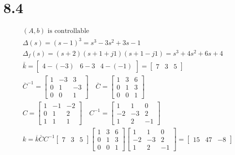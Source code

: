 \documentclass{article}
\begin{document}
\section*{8.4}
$$
\begin{aligned}
&(A, b) \text { is controllable }\\
&\Delta(s)=(s-1)^{3}=s^{3}-3 s^{2}+3 s-1\\
&\Delta_{f}(s)=(s+2)(s+1+j 1)(s+1-j 1)=s^{3}+4 s^{2}+6 s+4\\
&\bar{k}=\left[\begin{array}{lll}
4-(-3) & 6-3 & 4-(-1)
\end{array}\right]=\left[\begin{array}{lll}
7 & 3 & 5
\end{array}\right]\\
&\bar{C}^{-1}=\left[\begin{array}{ccc}
1 & -3 & 3 \\
0 & 1 & -3 \\
0 & 0 & 1
\end{array}\right] \quad \bar{C}=\left[\begin{array}{ccc}
1 & 3 & 6 \\
0 & 1 & 3 \\
0 & 0 & 1
\end{array}\right]\\
&C=\left[\begin{array}{ccc}
1 & -1 & -2 \\
0 & 1 & 2 \\
1 & 1 & 1
\end{array}\right] \quad C^{-1}=\left[\begin{array}{ccc}
1 & 1 & 0 \\
-2 & -3 & 2 \\
1 & 2 & -1
\end{array}\right]\\
&k=\overline{k} \bar{C} C^{-1}\left[\begin{array}{lll}
7 & 3 & 5
\end{array}\right]\left[\begin{array}{ccc}
1 & 3 & 6 \\
0 & 1 & 3 \\
0 & 0 & 1
\end{array}\right]\left[\begin{array}{ccc}
1 & 1 & 0 \\
-2 & -3 & 2 \\
1 & 2 & -1
\end{array}\right]=\left[\begin{array}{ccc}
15 & 47 & -8
\end{array}\right]
\end{aligned}
$$
\end{document}
